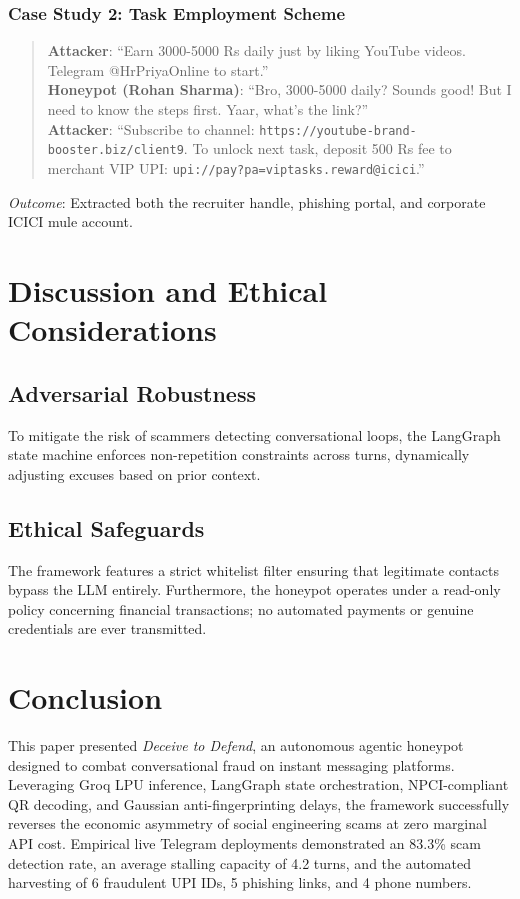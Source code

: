 \documentclass[conference]{IEEEtran}
\begin{document}
\subsubsection{Case Study 2: Task Employment Scheme}
\begin{quote}
\small
\textbf{Attacker}: ``Earn 3000-5000 Rs daily just by liking YouTube videos. Telegram @HrPriyaOnline to start.'' \\
\textbf{Honeypot (Rohan Sharma)}: ``Bro, 3000-5000 daily? Sounds good! But I need to know the steps first. Yaar, what's the link?'' \\
\textbf{Attacker}: ``Subscribe to channel: \texttt{https://youtube-brand-booster.biz/client9}. To unlock next task, deposit 500 Rs fee to merchant VIP UPI: \texttt{upi://pay?pa=viptasks.reward@icici}.''
\end{quote}
\textit{Outcome}: Extracted both the recruiter handle, phishing portal, and corporate ICICI mule account.

\section{Discussion and Ethical Considerations}
\subsection{Adversarial Robustness}
To mitigate the risk of scammers detecting conversational loops, the LangGraph state machine enforces non-repetition constraints across turns, dynamically adjusting excuses based on prior context.

\subsection{Ethical Safeguards}
The framework features a strict whitelist filter ensuring that legitimate contacts bypass the LLM entirely. Furthermore, the honeypot operates under a read-only policy concerning financial transactions; no automated payments or genuine credentials are ever transmitted.

\section{Conclusion}
This paper presented \textit{Deceive to Defend}, an autonomous agentic honeypot designed to combat conversational fraud on instant messaging platforms. Leveraging Groq LPU inference, LangGraph state orchestration, NPCI-compliant QR decoding, and Gaussian anti-fingerprinting delays, the framework successfully reverses the economic asymmetry of social engineering scams at zero marginal API cost. Empirical live Telegram deployments demonstrated an 83.3\% scam detection rate, an average stalling capacity of 4.2 turns, and the automated harvesting of 6 fraudulent UPI IDs, 5 phishing links, and 4 phone numbers.
\end{document}
